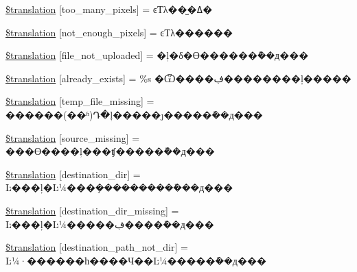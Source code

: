 \begin{DoxyCompactItemize}
\item 
\hyperlink{class_8upload_8zh___c_n_8gb-2312_8php_aa4051ef64e94a3f8295c63cf85544016}{\$translation} \mbox{[}\textquotesingle{}too\+\_\+many\+\_\+pixels\textquotesingle{}\mbox{]} = \textquotesingle{}ͼƬλ��̫�ߡ�\textquotesingle{}
\item 
\hyperlink{class_8upload_8zh___c_n_8gb-2312_8php_a1fe342c27ce61f4ff4e0120ba647033e}{\$translation} \mbox{[}\textquotesingle{}not\+\_\+enough\+\_\+pixels\textquotesingle{}\mbox{]} = \textquotesingle{}ͼƬλ������\textquotesingle{}
\item 
\hyperlink{class_8upload_8zh___c_n_8gb-2312_8php_a4ce76e7be0b3a03c2b47f6d70c21832e}{\$translation} \mbox{[}\textquotesingle{}file\+\_\+not\+\_\+uploaded\textquotesingle{}\mbox{]} = \textquotesingle{}�ļ�δ�ϴ������ܽ��д���\textquotesingle{}
\item 
\hyperlink{class_8upload_8zh___c_n_8gb-2312_8php_afd84e910217f04139f567c41e292afa5}{\$translation} \mbox{[}\textquotesingle{}already\+\_\+exists\textquotesingle{}\mbox{]} = \textquotesingle{}\%s �Ѿ����ڣ��������ļ�����\textquotesingle{}
\item 
\hyperlink{class_8upload_8zh___c_n_8gb-2312_8php_ab0fa87a88aba2624004581eed0633325}{\$translation} \mbox{[}\textquotesingle{}temp\+\_\+file\+\_\+missing\textquotesingle{}\mbox{]} = \textquotesingle{}������(��ʱ)Դ�ļ�����ȷ�����ܽ��д���\textquotesingle{}
\item 
\hyperlink{class_8upload_8zh___c_n_8gb-2312_8php_aceaaf7355acaaf10f0ae60378d03c468}{\$translation} \mbox{[}\textquotesingle{}source\+\_\+missing\textquotesingle{}\mbox{]} = \textquotesingle{}���ϴ����ļ���ʧ�����ܽ��д���\textquotesingle{}
\item 
\hyperlink{class_8upload_8zh___c_n_8gb-2312_8php_aff2427c72a2598aefa6d58df1dd18b08}{\$translation} \mbox{[}\textquotesingle{}destination\+\_\+dir\textquotesingle{}\mbox{]} = \textquotesingle{}Ŀ���ļ�Ŀ¼���ܱ����������ܽ��д���\textquotesingle{}
\item 
\hyperlink{class_8upload_8zh___c_n_8gb-2312_8php_a9ef28d3cf09942c6c0a1e77fa09185e8}{\$translation} \mbox{[}\textquotesingle{}destination\+\_\+dir\+\_\+missing\textquotesingle{}\mbox{]} = \textquotesingle{}Ŀ���ļ�Ŀ¼�����ڣ����ܽ��д���\textquotesingle{}
\item 
\hyperlink{class_8upload_8zh___c_n_8gb-2312_8php_a5704a67137126e8c87b7a364175929d4}{\$translation} \mbox{[}\textquotesingle{}destination\+\_\+path\+\_\+not\+\_\+dir\textquotesingle{}\mbox{]} = \textquotesingle{}Ŀ¼·������һ����Ч��Ŀ¼�����ܽ��д���\textquotesingle{}
\item 

\end{DoxyCompactItemize}
